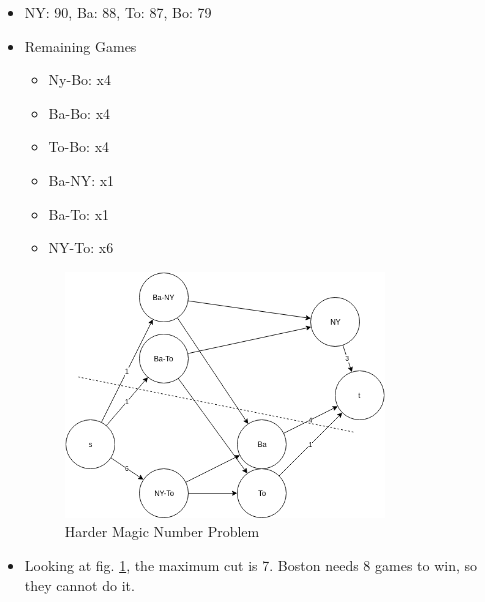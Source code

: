 \documentclass[12pt, letter]{article}
\begin{document}
\begin{itemize}
	\item NY: 90, Ba: 88, To: 87, Bo: 79
	\item Remaining Games
	\begin{itemize}
		\item Ny-Bo: x4
		\item Ba-Bo: x4
		\item To-Bo: x4
		\item Ba-NY: x1
		\item Ba-To: x1
		\item NY-To: x6
	\end{itemize}
	\begin{figure}[h]
		\centering
		\includegraphics[width=0.8\textwidth]{bb2}
		\caption{Harder Magic Number Problem}
		\label{fig:bb2}
	\end{figure}
	\item Looking at fig. \ref{fig:bb2}, the maximum cut is 7. Boston needs 8 games to win, so they cannot do it.
\end{itemize}
\end{document}
